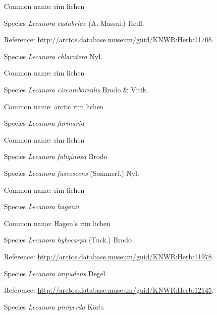 \documentclass[9pt, article]{memoir}
\begin{document}
\begin{multicols}{2}
Common name: rim lichen

\vspace{6pt}\noindent\hspace{36pt}Species \textit{Lecanora cadubriae} (A. Massal.) Hedl.


Reference: 
\url{http://arctos.database.museum/guid/KNWR:Herb:11708}.

\vspace{6pt}\noindent\hspace{36pt}Species \textit{Lecanora chlarotera} Nyl.


Common name: rim lichen

\vspace{6pt}\noindent\hspace{36pt}Species \textit{Lecanora circumborealis} Brodo \& Vitik.


Common name: arctic rim lichen

\vspace{6pt}\noindent\hspace{36pt}Species \textit{Lecanora farinaria}


Common name: rim lichen

\vspace{6pt}\noindent\hspace{36pt}Species \textit{Lecanora fuliginosa} Brodo


\vspace{6pt}\noindent\hspace{36pt}Species \textit{Lecanora fuscescens} (Sommerf.) Nyl.


Common name: rim lichen

\vspace{6pt}\noindent\hspace{36pt}Species \textit{Lecanora hagenii}


Common name: Hagen's rim lichen

\vspace{6pt}\noindent\hspace{36pt}Species \textit{Lecanora hybocarpa} (Tuck.) Brodo


Reference: 
\url{http://arctos.database.museum/guid/KNWR:Herb:11978}.

\vspace{6pt}\noindent\hspace{36pt}Species \textit{Lecanora impudens} Degel.


Reference: 
\url{http://arctos.database.museum/guid/KNWR:Herb:12145}.

\vspace{6pt}\noindent\hspace{36pt}Species \textit{Lecanora piniperda} Körb.



\end{multicols}
\end{document}
